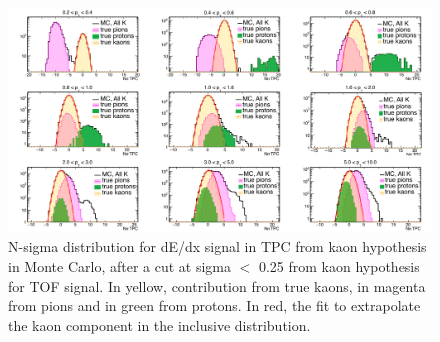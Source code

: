 \begin{figure}[!h]
 \centering
 \includegraphics[angle=0, width=15cm]{./FigCap5/KaonTPCFromTOF_MC.png}
 \caption{N-sigma distribution for dE/dx signal in TPC from kaon hypothesis in Monte Carlo, after a cut at sigma $<$ 0.25 from kaon hypothesis for TOF signal. In yellow, contribution from true kaons, in magenta from pions and in green from protons. In red, the fit to extrapolate the kaon component in the inclusive distribution.}
 \label{fig:MCKaonsTPC} 
\end{figure}

